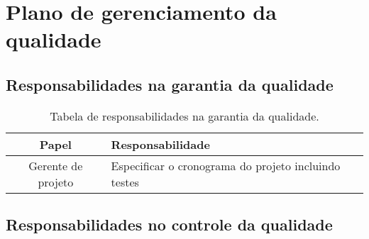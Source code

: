 
\chapter{Plano de gerenciamento da qualidade}

\section{Responsabilidades na garantia da qualidade}


\begin{table}[H]
	\begin{tabularx}{\textwidth}{| c | X |}
		\hline
		\textbf{Papel}     & \textbf{Responsabilidade}                            \\
		\hline
		Gerente de projeto & Especificar o cronograma do projeto incluindo testes \\
		\hline
	\end{tabularx}
	\centering
	\caption{Tabela de responsabilidades na garantia da qualidade.}
\end{table}

\section{Responsabilidades no controle da qualidade}


